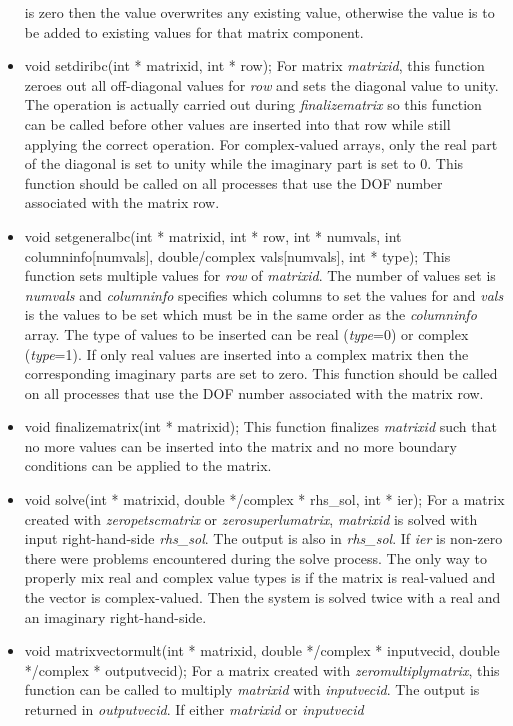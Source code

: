 \begin{itemize}
is zero then the value overwrites any existing value, otherwise the value is to be added
to existing values for that matrix component.
\item  void setdiribc(int * matrixid, int * row);  For matrix \textit{matrixid}, this function
zeroes out all off-diagonal values for \textit{row} and sets the diagonal value to unity.  The operation is
actually carried out during \textit{finalizematrix} so this function can be called before other values
are inserted into that row while still applying the correct operation.  For complex-valued arrays, 
only the real part of the diagonal is set to unity while the imaginary part is set to 0.  This function 
should be called on all processes that use the DOF number associated with the matrix row.
\item  void setgeneralbc(int * matrixid, int * row, int * numvals,
		     int  columninfo[numvals], double/complex vals[numvals], int * type);
This function sets multiple values for \textit{row} of \textit{matrixid}.  The number of values set is
\textit{numvals} and \textit{columninfo} specifies which columns to set the values for and 
\textit{vals} is the values to be set which must be in the same order as the \textit{columninfo} array.
 The type of values to
 be inserted can be real (\textit{type}=0)
or complex (\textit{type}=1). If only real values are inserted into a complex matrix then the corresponding
imaginary parts are set to zero.
This function 
should be called on all processes that use the DOF number associated with the matrix row.
\item  void finalizematrix(int * matrixid);  This function finalizes \textit{matrixid} such that no
more values can be inserted into the matrix and no more boundary conditions can be applied to the matrix.
\item  void solve(int * matrixid, double */complex * rhs\_sol, int * ier);  For a matrix created with \textit{zeropetscmatrix}
or \textit{zerosuperlumatrix}, \textit{matrixid} is solved with input right-hand-side \textit{rhs\_sol}. 
The output  is also in \textit{rhs\_sol}.  If \textit{ier} is non-zero there were problems encountered during
the solve process.  The only way to properly mix real and complex value types is if the matrix is real-valued
and the vector is complex-valued.  Then the system is solved twice with a real and an imaginary right-hand-side.  
\item  void matrixvectormult(int * matrixid, double */complex * inputvecid, double */complex * outputvecid);  For a matrix created with \textit{zeromultiplymatrix}, this function can be called to multiply \textit{matrixid} with \textit{inputvecid}.  The output is returned in \textit{outputvecid}.  If either \textit{matrixid} or \textit{inputvecid}

\end{itemize}
